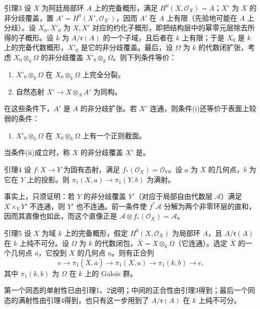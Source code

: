 \begin{statement}{引理3}
设 $X$ 为阿廷局部环 $A$ 上的完备概形，满足 $H^0(X,\mathcal O_X)=A$；$X'$ 为 $X$ 的非分歧覆盖，置 $A'=H^0(X',\mathcal O_{X'})$，因而 $A'$ 在 $A$ 上有限（先验地可能在 $A$ 上分歧）。设 $X_0,X'_0$ 为 $X,X'$ 对应的约化子概形，即把结构层中的幂零元层除去所得的子概形。设 $k$ 为 $A/\mathfrak r(A)$ 的一个子域，且后者在 $k$ 上有限；于是 $X_0$ 是 $k$ 上的完备代数概形，$X'_0$ 是它的非分歧覆盖。最后，设 $\Omega$ 为 $k$ 的代数闭扩张，考虑 $X_0\otimes_k\Omega$ 的非分歧覆盖 $X'_0\otimes_k\Omega$。则下列条件等价：
\begin{enumerate}
\item[(i)] $X'_0\otimes_k\Omega$ 在 $X_0\otimes_k\Omega$ 上完全分裂。
\item[(ii)] 自然态射 $X'\to X\otimes_AA'$ 为同构。
\end{enumerate}
在这些条件下，$A'$ 是 $A$ 的非分歧扩张。若 $X'$ 连通，则条件(i)还等价于表面上较弱的条件：
\begin{enumerate}
\item[(i$'$)] $X'_0\otimes_k\Omega$ 在 $X_0\otimes_k\Omega$ 上有一个正则截面。
\end{enumerate}
\end{statement}
当条件(ii)成立时，称 $X$ 的非分歧覆盖 $X'$ 是。

\begin{statement}{引理4}
设 $f:X\to Y$ 为固有态射，满足 $f_*(\mathcal O_X)=\mathcal O_Y$。设 $a$ 为 $X$ 的几何点，$b$ 为它在 $Y$ 上的投影。则 $\pi_1(X,a)\to\pi_1(Y,b)$ 为满射。
\end{statement}
事实上，只须证明：若 $Y$ 的非分歧覆盖 $Y'$（对应于局部自由代数层 $\mathcal A$）满足 $X\times_YY'$ 不连通，则 $Y'$ 也不连通。前一条件使 $f^*\mathcal A$ 分解为两个非零环层的直和，因而其直像也如此，而这个直像正是 $\mathcal A\otimes f_*(\mathcal O_X)=\mathcal A$。

\begin{statement}{引理5}
设 $X$ 为域 $k$ 上的完备概形，假定 $H^0(X,\mathcal O_X)$ 为局部环 $A$，且 $A/\mathfrak r(A)$ 在 $k$ 上纯不可分。设 $\Omega$ 为 $k$ 的代数闭包，$\overline X=X\otimes_k\Omega$（它连通）。选定 $\overline X$ 的一个几何点 $\overline a$，它投到 $X$ 的几何点 $a$。则有正合列
\[
e\longrightarrow\pi_1(\overline X,\overline a)
\longrightarrow\pi_1(X,a)\longrightarrow\pi_1(k,b)\longrightarrow e,
\]
其中 $\pi_1(k,b)$ 为 $\Omega$ 在 $k$ 上的 Galois 群。
\end{statement}
第一个同态的单射性已由引理1、2说明；中间的正合性由引理3得到；最后一个同态的满射性由引理4得到，也只有这一步用到了 $A/\mathfrak r(A)$ 在 $k$ 上纯不可分。

